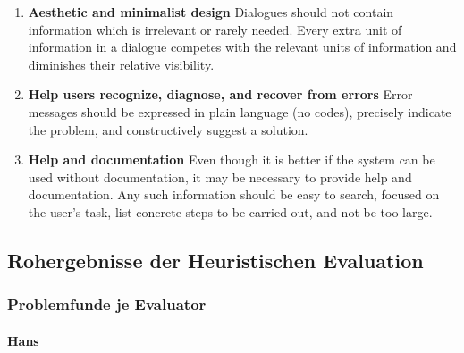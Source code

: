 \documentclass[
  12pt,
  ngerman,
  a4paper,
]{article}
\let\oldparagraph\paragraph
\renewcommand{\paragraph}[1]{\oldparagraph{#1}\mbox{}}
\begin{document}
\begin{enumerate}
\item
  \textbf{Aesthetic and minimalist design} Dialogues should not contain
  information which is irrelevant or rarely needed. Every extra unit of
  information in a dialogue competes with the relevant units of
  information and diminishes their relative visibility.
\item
  \textbf{Help users recognize, diagnose, and recover from errors} Error
  messages should be expressed in plain language (no codes), precisely
  indicate the problem, and constructively suggest a solution.
\item
  \textbf{Help and documentation} Even though it is better if the system
  can be used without documentation, it may be necessary to provide help
  and documentation. Any such information should be easy to search,
  focused on the user's task, list concrete steps to be carried out, and
  not be too large.
\end{enumerate}

\hypertarget{sec:heuristik-rohergebnisse}{%
\subsection{Rohergebnisse der Heuristischen
Evaluation}\label{sec:heuristik-rohergebnisse}}

\hypertarget{problemfunde-je-evaluator}{%
\subsubsection{Problemfunde je
Evaluator}\label{problemfunde-je-evaluator}}

\hypertarget{hans}{%
\paragraph{Hans}\label{hans}}
\end{document}
